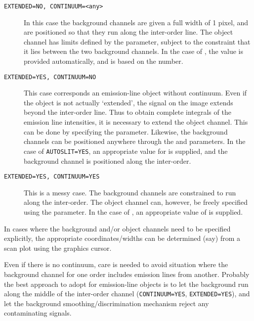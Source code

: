 \begin{description}

\item [{\tt EXTENDED=NO, CONTINUUM=<any>}] In this case the background
      channels are given a full width of 1 pixel, and are positioned so that
      they run along the inter-order line.  The object channel has limits
      defined by the  parameter, subject
      to the constraint that it
      lies between the two background channels.  In the case of
      , the
       value is provided automatically,
      and is based on the  number.

\item [{\tt EXTENDED=YES, CONTINUUM=NO}] This case corresponds an
      emission-line object without continuum.  Even if the object is not
      actually `extended', the signal on the image extends beyond the
      inter-order line.  Thus to obtain complete integrals of the emission
      line intensities, it is necessary to extend the object channel.  This
      can be done by specifying the  parameter.
      Likewise, the
      background channels can be positioned anywhere through the
      and  parameters.  In the case of
      \verb+AUTOSLIT=YES+, an
      appropriate value for  is supplied, and
      the background
      channel is positioned along the inter-order.

\item [{\tt EXTENDED=YES, CONTINUUM=YES}] This is a messy case.  The
      background channels are constrained to run along the inter-order.
      The object channel can, however, be freely specified using the
       parameter.
      In the case of , an
      appropriate value of  is supplied.

\end{description}

In cases where the background and/or object channels need to be
specified explicitly, the appropriate coordinates/widths can be
determined (say) from a scan plot using the graphics cursor.

Even if there is no continuum, care is needed to avoid situation where the
background channel for one order includes emission lines from another.
Probably the best approach to adopt for emission-line objects is to let
the background run along the middle of the inter-order channel
(\verb+CONTINUUM=YES+, \verb+EXTENDED=YES+), and  let  the  background 
smoothing/discrimination mechanism reject any contaminating signals.


